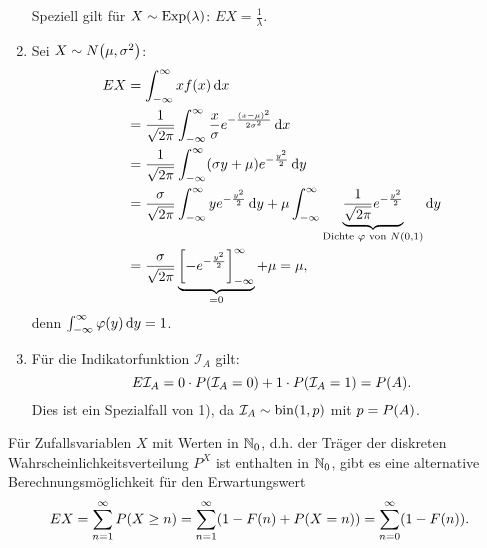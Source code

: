\documentclass{lecture}
\begin{document}
\begin{example}
\begin{enumerate}
            Speziell gilt für \(X \sim \Exp\parentheses*{\lambda}\): \(EX = \frac{1}{\lambda}\).
            \item Sei \(X \sim N\parentheses*{\mu, \sigma^2}\):
            \begin{align*}
                EX &= \int_{-\infty}^\infty xf\parentheses*{x}\d x\\
                &= \frac{1}{\sqrt{2\pi}}\int_{-\infty}^\infty \frac{x}{\sigma}e^{-\frac{\parentheses*{x - \mu}^2}{2\sigma^2}}\d x\\
                &= \frac{1}{\sqrt{2\pi}}\int_{-\infty}^\infty \parentheses*{\sigma y + \mu}e^{-\frac{y^2}{2}}\d y\\
                &= \frac{\sigma}{\sqrt{2\pi}}\int_{-\infty}^\infty ye^{-\frac{y^2}{2}}\d y + \mu\int_{-\infty}^\infty \underbrace{\frac{1}{\sqrt{2\pi}}e^{-\frac{y^2}{2}}}_{\text{Dichte }\varphi\text{ von }N\parentheses*{0, 1}}\d y\\
                &= \frac{\sigma}{\sqrt{2\pi}}\underbrace{\brackets*{-e^{-\frac{y^2}{2}}}_{-\infty}^\infty}_{= 0} + \mu = \mu,
            \end{align*}
            denn \(\int_{-\infty}^\infty \varphi\parentheses*{y}\d y = 1\).
            \item Für die Indikatorfunktion \(\mathcal{I}_A\) gilt:
            \[
                E\mathcal{I}_A = 0 \cdot P\parentheses*{\mathcal{I}_A = 0} + 1 \cdot P\parentheses*{\mathcal{I}_A = 1} = P\parentheses*{A}.
            \]
            Dies ist ein Spezialfall von 1), da \(\mathcal{I}_A \sim \bin\parentheses*{1, p}\) mit \(p = P\parentheses*{A}\).
        \end{enumerate}
    \end{example}
    
    \begin{remark}
        Für Zufallsvariablen \(X\) mit Werten in \(\mathbb{N}_0\), d.h. der Träger der diskreten Wahrscheinlichkeitsverteilung \(P^X\) ist enthalten in \(\mathbb{N}_0\), gibt es eine alternative Berechnungsmöglichkeit für den Erwartungswert
        \[
            EX = \sum_{n = 1}^\infty P\parentheses*{X \ge n} = \sum_{n = 1}^\infty \parentheses*{1 - F\parentheses*{n} + P\parentheses*{X = n}} = \sum_{n = 0}^\infty \parentheses*{1 - F\parentheses*{n}}.
        \]
    \end{remark}
    
\end{document}
